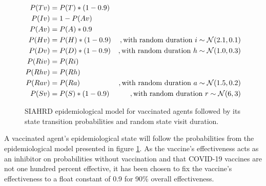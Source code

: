 \begin{figure}
    \begin{minipage}{\textwidth}
        \begin{align*}
            P(Tv) &= P(T) * (1 - 0.9) \\
            P(Iv) &= 1 - P(Av) \\
            P(Av) &= P(A) * 0.9 \\
            P(Hv) &= P(H) * (1 - 0.9)&, \textnormal{with random duration } i \sim \mathcal{N}(2.1, 0.1) \\
            P(Dv) &= P(D) * (1 - 0.9)&, \textnormal{with random duration } h \sim \mathcal{N}(1.0, 0.3) \\
            P(Riv) &= P(Ri) \\
            P(Rhv) &= P(Rh) \\
            P(Rav) &= P(Ra)&, \textnormal{with random duration } a \sim \mathcal{N}(1.5, 0.2) \\
            P(Sv) &= P(S) * (1 - 0.9)&, \textnormal{with random duration } r \sim \mathcal{N}(6, 3)
        \end{align*}
    \end{minipage}
    \caption{SIAHRD epidemiological model for vaccinated agents followed by its state transition probabilities and random state visit duration.
    \label{fig:epidemiological_model_vaccination}}
\end{figure}

A vaccinated agent's epidemiological state will follow the probabilities from the epidemiological model presented in figure \ref{fig:epidemiological_model_vaccination}.
As the vaccine's effectiveness acts as an inhibitor on probabilities without vaccination and that COVID-19 vaccines are not one hundred percent effective, it has been chosen to fix the vaccine's effectiveness to a float constant of 0.9 for 90\% overall effectiveness.

